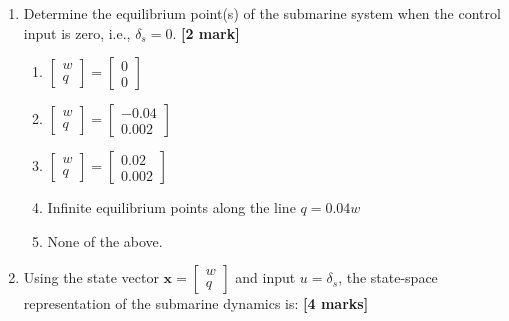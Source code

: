 \documentclass{article}
\begin{document}
\begin{enumerate}[resume]
    \item Determine the equilibrium point(s) of the submarine system when the control input is zero, i.e., $\delta_s = 0$. \hfill \textbf{[2 mark]}
    
    \begin{enumerate}[label=\alph*.]
        \item $\begin{bmatrix} w \\ q \end{bmatrix} = \begin{bmatrix} 0 \\ 0 \end{bmatrix}$
        \vspace{2mm}

        \item $\begin{bmatrix} w \\ q \end{bmatrix} = \begin{bmatrix} -0.04 \\ 0.002 \end{bmatrix}$
        \vspace{2mm}

        \item $\begin{bmatrix} w \\ q \end{bmatrix} = \begin{bmatrix} 0.02 \\ 0.002 \end{bmatrix}$
        \vspace{2mm}

        \item Infinite equilibrium points along the line $q = 0.04w$
        \vspace{2mm}

        \item None of the above.
    \end{enumerate}

    \item Using the state vector $\mathbf{x} = \begin{bmatrix} w \\ q \end{bmatrix}$ and input $u = \delta_s$, the state-space representation of the submarine dynamics is: \hfill \textbf{[4 marks]}
    

\end{enumerate}
\end{document}
